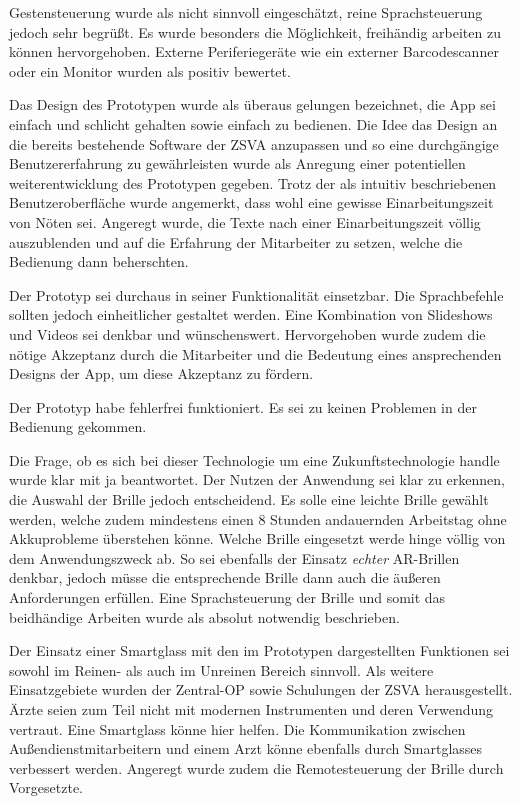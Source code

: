 Gestensteuerung wurde als nicht sinnvoll eingeschätzt, reine Sprachsteuerung jedoch sehr begrüßt. Es wurde besonders die Möglichkeit, freihändig arbeiten zu können hervorgehoben. Externe Periferiegeräte wie ein externer Barcodescanner oder ein Monitor wurden als positiv bewertet.

Das Design des Prototypen wurde als überaus gelungen bezeichnet, die App sei einfach und schlicht gehalten sowie einfach zu bedienen. Die Idee das Design an die bereits bestehende Software der ZSVA anzupassen und so eine durchgängige Benutzererfahrung zu gewährleisten wurde als Anregung einer potentiellen weiterentwicklung des Prototypen gegeben. Trotz der als intuitiv beschriebenen Benutzeroberfläche wurde angemerkt, dass wohl eine gewisse Einarbeitungszeit von Nöten sei. Angeregt wurde, die Texte nach einer Einarbeitungszeit völlig auszublenden und auf die Erfahrung der Mitarbeiter zu setzen, welche die Bedienung dann beherschten. 

Der Prototyp sei durchaus in seiner Funktionalität einsetzbar. Die Sprachbefehle sollten jedoch einheitlicher gestaltet werden. Eine Kombination von Slideshows und Videos sei denkbar und wünschenswert. Hervorgehoben wurde zudem die nötige Akzeptanz durch die Mitarbeiter und die Bedeutung eines ansprechenden Designs der App, um diese Akzeptanz zu fördern.

Der Prototyp habe fehlerfrei funktioniert. Es sei zu keinen Problemen in der Bedienung gekommen.

Die Frage, ob es sich bei dieser Technologie um eine Zukunftstechnologie handle wurde klar mit ja beantwortet. Der Nutzen der Anwendung sei klar zu erkennen, die Auswahl der Brille jedoch entscheidend. Es solle eine leichte Brille gewählt werden, welche zudem mindestens einen 8 Stunden andauernden Arbeitstag ohne Akkuprobleme überstehen könne. Welche Brille eingesetzt werde hinge völlig von dem Anwendungszweck ab. So sei ebenfalls der Einsatz \emph{echter} AR-Brillen denkbar, jedoch müsse die entsprechende Brille dann auch die äußeren Anforderungen erfüllen. Eine Sprachsteuerung der Brille und somit das beidhändige Arbeiten wurde als absolut notwendig beschrieben. 

Der Einsatz einer Smartglass mit den im Prototypen dargestellten Funktionen sei sowohl im Reinen- als auch im Unreinen Bereich sinnvoll. Als weitere Einsatzgebiete wurden der Zentral-OP sowie Schulungen der ZSVA herausgestellt. Ärzte seien zum Teil nicht mit modernen Instrumenten und deren Verwendung vertraut. Eine Smartglass könne hier helfen. Die Kommunikation zwischen Außendienstmitarbeitern und einem Arzt könne ebenfalls durch Smartglasses verbessert werden. Angeregt wurde zudem die Remotesteuerung der Brille durch Vorgesetzte.

